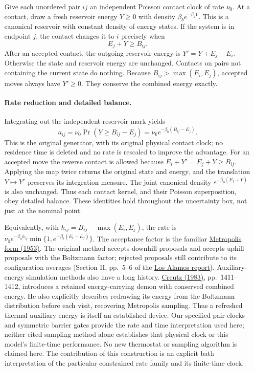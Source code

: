 \documentclass[11pt]{article}
\begin{document}
Give each unordered pair $ij$ an independent Poisson contact clock of
rate $\nu_0$. At a contact, draw a fresh reservoir energy
$Y\geq0$ with density $\beta_b e^{-\beta_bY}$. This is a canonical
reservoir with constant density of energy states. If the system is in
endpoint $j$, the contact changes it to $i$ precisely when
\[
 E_j+Y\geq B_{ij}.
\]
After an accepted contact, the outgoing reservoir energy is
$Y'=Y+E_j-E_i$. Otherwise the state and reservoir energy are unchanged.
Contacts on pairs not containing the current state do nothing.
Because $B_{ij}>\max(E_i,E_j)$, accepted moves always have $Y'\geq0$.
They conserve the combined energy exactly.

\paragraph{Rate reduction and detailed balance.}
Integrating out the independent reservoir mark yields
\[
 a_{ij}=\nu_0\Pr(Y\geq B_{ij}-E_j)
       =\nu_0e^{-\beta_b(B_{ij}-E_j)}.
\]
This is the original generator, with its original physical contact clock;
no residence time is deleted and no rate is rescaled to improve the
advantage. For an accepted move the reverse contact is allowed because
$E_i+Y'=E_j+Y\geq B_{ij}$. Applying the map twice returns the original
state and energy, and the translation $Y\mapsto Y'$ preserves its
integration measure. The joint canonical density
$e^{-\beta_b(E_j+Y)}$ is also unchanged. Thus each contact kernel, and
their Poisson superposition, obey detailed balance. These identities
hold throughout the uncertainty box, not just at the nominal point.

Equivalently, with $h_{ij}=B_{ij}-\max(E_i,E_j)$, the rate is
$\nu_0e^{-\beta_bh_{ij}}\min\{1,e^{-\beta_b(E_i-E_j)}\}$.
The acceptance factor is the familiar
\href{https://doi.org/10.1063/1.1699114}{Metropolis form (1953)}.
The original method accepts downhill proposals and accepts uphill proposals
with the Boltzmann factor; rejected proposals still contribute to its
configuration averages (Section II, pp.~5--6 of the
\href{https://www.osti.gov/servlets/purl/4390578}{Los Alamos report}).
Auxiliary-energy simulation methods also have a long history.
\href{https://doi.org/10.1103/PhysRevLett.50.1411}{Creutz (1983)},
pp.~1411--1412, introduces a retained energy-carrying demon with conserved
combined energy. He also explicitly describes redrawing its energy from
the Boltzmann distribution before each visit, recovering Metropolis sampling.
Thus a refreshed thermal auxiliary energy is itself an established device.
Our specified pair clocks and symmetric barrier gates provide the rate and
time interpretation used here; neither cited sampling method alone
establishes that physical clock or this model's finite-time performance.
No new thermostat or sampling algorithm is claimed here.
The contribution of this construction is an explicit bath interpretation
of the particular constrained rate family and its finite-time clock.
\end{document}
